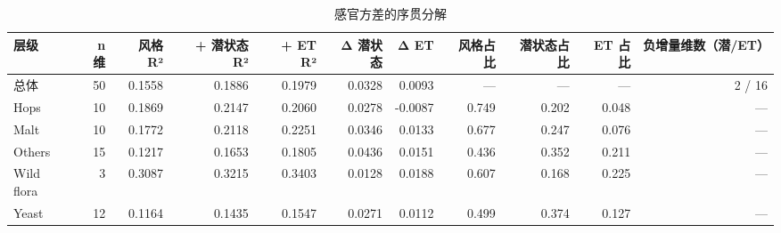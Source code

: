 \begin{table}[tbp]
\centering
\caption{感官方差的序贯分解}
\label{tab:t11_variance}
\footnotesize
\setlength{\tabcolsep}{3.5pt}
\begin{tabular}{lrrrrrrrrrr}
\toprule
层级 & n 维 & 风格 R² & + 潜状态 R² & + ET R² & Δ 潜状态 & Δ ET & 风格占比 & 潜状态占比 & ET 占比 & 负增量维数（潜/ET） \\
\midrule
总体 & 50 & 0.1558 & 0.1886 & 0.1979 & 0.0328 & 0.0093 & — & — & — & 2 / 16 \\
Hops & 10 & 0.1869 & 0.2147 & 0.2060 & 0.0278 & -0.0087 & 0.749 & 0.202 & 0.048 & — \\
Malt & 10 & 0.1772 & 0.2118 & 0.2251 & 0.0346 & 0.0133 & 0.677 & 0.247 & 0.076 & — \\
Others & 15 & 0.1217 & 0.1653 & 0.1805 & 0.0436 & 0.0151 & 0.436 & 0.352 & 0.211 & — \\
Wild flora & 3 & 0.3087 & 0.3215 & 0.3403 & 0.0128 & 0.0188 & 0.607 & 0.168 & 0.225 & — \\
Yeast & 12 & 0.1164 & 0.1435 & 0.1547 & 0.0271 & 0.0112 & 0.499 & 0.374 & 0.127 & — \\
\bottomrule
\end{tabular}
\end{table}
